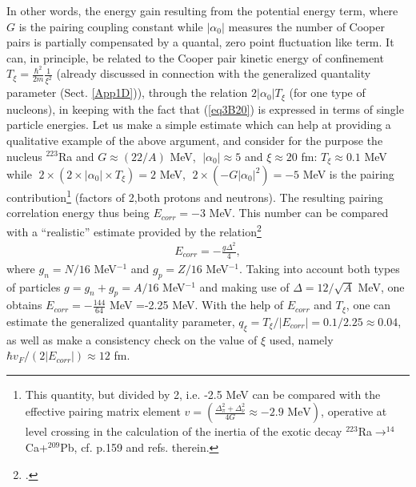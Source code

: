 
 In other words, the energy gain resulting from the potential energy term, where $G$ is the pairing coupling constant while $|\alpha_0|$ measures the number of Cooper pairs is partially compensated by a quantal, zero point fluctuation like term. It can, in principle, be related to the Cooper pair kinetic energy of confinement $T_\xi=\frac{\hbar^2}{2m}\frac{1}{\xi^2}$ (already discussed in connection with the generalized quantality parameter (Sect. \ref{App1D})), through the relation $2|\alpha_0|T_\xi$ (for one type of nucleons), in keeping with the fact that (\ref{eq3B20}) is expressed in terms of single particle energies. Let us make a simple estimate which can help at providing a qualitative example of the above argument, and consider for the purpose the nucleus $^{223}$Ra and $G\approx(22/A)$ MeV,      $\;|\alpha_0|\approx 5$ and $\xi\approx 20$ fm: $T_\xi\approx 0.1$ MeV while $\;2\times(2\times|\alpha_0|\times T_\xi)=2$ MeV, $\;2\times (-G|\alpha_0|^2)=-5$ MeV is the pairing contribution\footnote{This quantity, but divided by 2, i.e. -2.5 MeV can be compared with the effective pairing matrix element $v=\left(\frac{\Delta_\pi^2+\Delta_\nu^2}{4G}\approx -2.9 \text{ MeV}\right)$, operative at level crossing in the calculation of the inertia of the exotic decay $^{223}$Ra$\rightarrow^{14}$Ca+$^{209}$Pb, cf. \cite{Brink:05} p.159 and refs. therein.} (factors of 2,both protons and neutrons). The resulting pairing correlation energy thus being $E_{corr}=-3$ MeV. This number can be compared with a ``realistic'' estimate provided by the relation\footnote{\cite{Brink:05}.}
   \begin{align}\label{eq3B21}
E_{corr}=-\frac{g\Delta^2}{4},
   \end{align}  
 where $g_n=N/16$ MeV$^{-1}$ and $g_p=Z/16$ MeV$^{-1}$. Taking into account both types of particles $g=g_n+g_p=A/16$ MeV$^{-1}$ and making use of $\Delta=12/\sqrt{A}$ MeV, one obtains $E_{corr}=-\frac{144}{64}$ MeV =-2.25 MeV. With the help of $E_{corr}$ and $T_\xi$, one can estimate the generalized quantality parameter, $q_\xi=T_\xi/|E_{corr}|=0.1/2.25\approx 0.04$, as well as make a consistency check  on the value of $\xi$ used, namely $\hbar v_F/(2|E_{corr}|)\approx 12$ fm.
 
